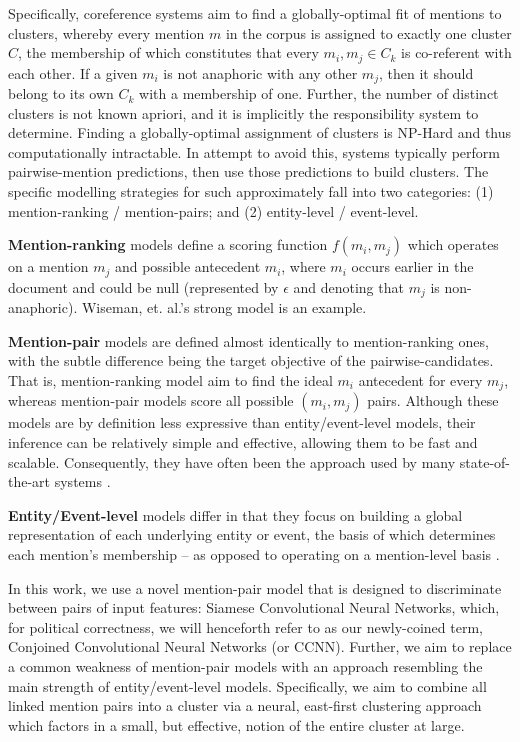 \documentclass[11pt,a4paper]{article}
\begin{document}
Specifically, coreference systems aim to find a globally-optimal fit of mentions to clusters, whereby every mention $m$ in the corpus is assigned to exactly one cluster $C$, the membership of which constitutes that every ${m_i,m_j} \in C_k$ is co-referent with each other.  If a given $m_i$ is not anaphoric with any other $m_j$, then it should belong to its own $C_k$ with a membership of one.  Further, the number of distinct clusters is not known apriori, and it is implicitly the responsibility system to determine.  Finding a globally-optimal assignment of clusters is NP-Hard and thus computationally intractable.  In attempt to avoid this, systems typically perform pairwise-mention predictions, then use those predictions to build clusters. The specific modelling strategies for such approximately fall into two categories: (1) mention-ranking / mention-pairs; and (2) entity-level / event-level.

\textbf{Mention-ranking} models define a scoring function $f(m_i,m_j)$ which operates on a mention $m_j$ and possible antecedent $m_i$, where $m_i$ occurs earlier in the document and could be null (represented by $\epsilon$ and denoting that $m_j$ is non-anaphoric).  Wiseman, et. al.'s  strong model is an example.

\textbf{Mention-pair} models are defined almost identically to mention-ranking ones, with the subtle difference being the target objective of the pairwise-candidates.  That is, mention-ranking model aim to find the ideal $m_i$ antecedent for every $m_j$, whereas mention-pair models score all possible $(m_i,m_j)$ pairs.  Although these models are by definition less expressive than entity/event-level models, their inference can be relatively simple and effective, allowing them to be fast and scalable.  Consequently, they have often been the approach used by many state-of-the-art systems \cite{Soon:2001:MLA:972597.972602,DBLP:conf/emnlp/DurrettK13}.

\textbf{Entity/Event-level} models differ in that they focus on building a global representation of each underlying entity or event, the basis of which determines each mention's membership -- as opposed to operating on a mention-level basis \cite{DBLP:journals/corr/WisemanRS16,clark2016improving}.

In this work, we use a novel mention-pair model that is designed to discriminate between pairs of input features: Siamese Convolutional Neural Networks, which, for political correctness, we will henceforth refer to as our newly-coined term, Conjoined Convolutional Neural Networks (or CCNN).  Further, we aim to replace a common weakness of mention-pair models with an approach resembling the main strength of entity/event-level models. Specifically, we aim to combine all linked mention pairs into a cluster via a neural, east-first clustering approach which factors in a small, but effective, notion of the entire cluster at large.
\end{document}
